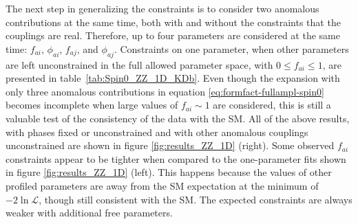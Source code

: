 The next step in generalizing the constraints is to consider two anomalous contributions at the same time, both with
and without the constraints that the couplings are real. Therefore, up to four parameters are considered at the same
time: $f_{ai}$, $\phi_{ai}$, $f_{aj}$, and $\phi_{aj}$. Constraints on one parameter, when other parameters are left unconstrained in
the full allowed parameter space, with $0\le f_{ai}\le 1$, are presented in table~\ref{tab:Spin0_ZZ_1D_KDb}.
Even though the expansion with only three anomalous contributions in equation \eqref{eq:formfact-fullampl-spin0} becomes incomplete when large values of $f_{ai}\sim 1$ are considered,
this is still a valuable test of the consistency of the data with the SM.
All of the above results, with phases fixed or unconstrained and with other anomalous couplings unconstrained
are shown in figure \ref{fig:results_ZZ_1D} (right).
Some observed $f_{ai}$ constraints appear to be tighter when compared to the one-parameter fits shown in
figure \ref{fig:results_ZZ_1D} (left). This happens because the values of other profiled parameters are away
from the SM expectation at the minimum of $-2\ln\mathcal{L}$, though still consistent with the SM.
The expected constraints are always weaker with additional free parameters.

